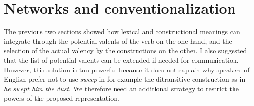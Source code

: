 \section{Networks and conventionalization}

The previous two sections showed how lexical and constructional meanings can integrate through the potential valents of the verb on the one hand, and the selection of the actual valency by the constructions on the other. I also suggested that the list of potential valents can be extended if needed for communication. However, this solution is too powerful because it does not explain why speakers of English prefer not to use {\em sweep} in for example the ditransitive construction as in {\em *he swept him the dust}. We therefore need an additional strategy to restrict the powers of the proposed representation.

